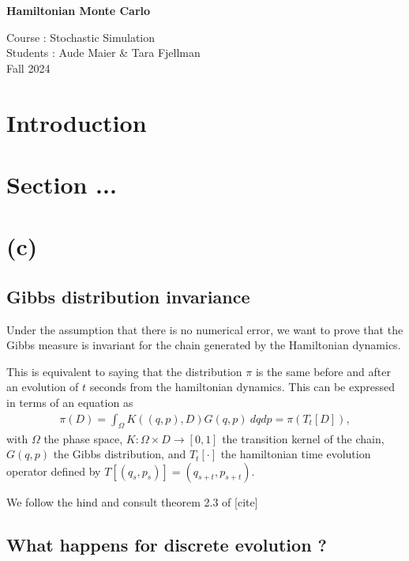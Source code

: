\documentclass[a4paper, 12pt,oneside]{article}
\begin{document}
 
	\begin{center}
	    \Large
	    \textbf{Hamiltonian Monte Carlo} 
	    \vspace{0.4cm}
	    \large

		Course : Stochastic Simulation \\
	    Students : Aude Maier \& Tara Fjellman \\
	    \small{Fall 2024}
	\end{center}

	\section{Introduction}
	\section{Section ...}
	\section{(c)}
        \subsection{Gibbs distribution invariance}
		Under the assumption that there is no numerical error, we want to prove that the Gibbs measure is invariant for the chain generated by the Hamiltonian dynamics.

		This is equivalent to saying that the distribution $\pi$ is the same before and after an evolution of $t$ seconds from the hamiltonian dynamics. This can be expressed in terms of an equation as 
		\begin{gather}
			\pi(D)=\int_{\Omega} K((q,p),D) G(q,p) \ dq dp=\pi(T_t[D]),
		\end{gather}
		with $\Omega$ the phase space, $K:\Omega \times D\to [0,1]$ the transition kernel of the chain, $G(q,p)$ the Gibbs distribution, and $T_t[\cdot]$ the hamiltonian time evolution operator defined by $T[(q_s,p_s)]=(q_{s+t},p_{s+t})$.

		We follow the hind and consult theorem 2.3 of [cite] 
        \subsection{What happens for discrete evolution ?}
\end{document}
